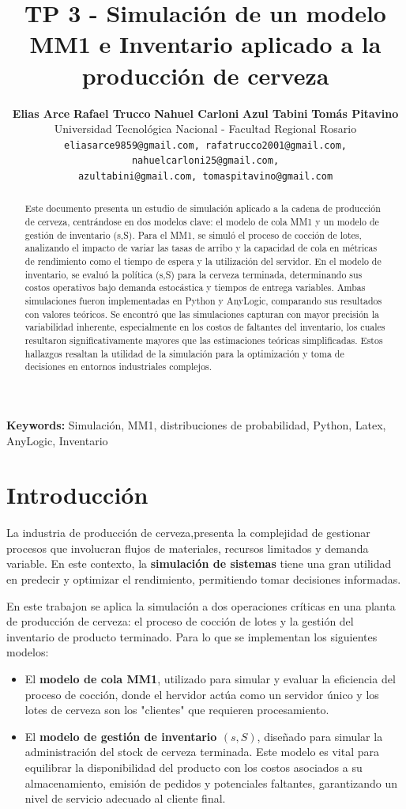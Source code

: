 \documentclass{article}
\title{TP 3 - Simulación de un modelo MM1 e Inventario aplicado a la producción de cerveza}
\author{
  \textbf{Elias Arce} \quad \textbf{Rafael Trucco} \quad \textbf{Nahuel Carloni} \quad \textbf{Azul Tabini} \quad \textbf{Tomás Pitavino} \\
  \small Universidad Tecnológica Nacional - Facultad Regional Rosario \\
  \small \texttt{eliasarce9859@gmail.com, rafatrucco2001@gmail.com, nahuelcarloni25@gmail.com,} \\
  \small \texttt{azultabini@gmail.com, tomaspitavino@gmail.com}
}
\begin{document}
\maketitle


\begin{abstract}
Este documento presenta un estudio de simulación aplicado a la cadena de producción de cerveza, centrándose en dos modelos clave: el modelo de cola MM1 y un modelo de gestión de inventario (s,S). Para el MM1, se simuló el proceso de cocción de lotes, analizando el impacto de variar las tasas de arribo y la capacidad de cola en métricas de rendimiento como el tiempo de espera y la utilización del servidor. En el modelo de inventario, se evaluó la política (s,S) para la cerveza terminada, determinando sus costos operativos bajo demanda estocástica y tiempos de entrega variables. Ambas simulaciones fueron implementadas en Python y AnyLogic, comparando sus resultados con valores teóricos. Se encontró que las simulaciones capturan con mayor precisión la variabilidad inherente, especialmente en los costos de faltantes del inventario, los cuales resultaron significativamente mayores que las estimaciones teóricas simplificadas. Estos hallazgos resaltan la utilidad de la simulación para la optimización y toma de decisiones en entornos industriales complejos.
\end{abstract}
\textbf{Keywords:} Simulación, MM1, distribuciones de probabilidad, Python, Latex, AnyLogic, Inventario


\section{Introducción}
La industria de producción de cerveza,presenta la complejidad de gestionar procesos que involucran flujos de materiales, recursos limitados y demanda variable. En este contexto, la \textbf{simulación de sistemas} tiene una gran utilidad en predecir y optimizar el rendimiento, permitiendo tomar decisiones informadas.


En este trabajon se aplica la simulación a dos operaciones críticas en una planta de producción de cerveza: el proceso de cocción de lotes y la gestión del inventario de producto terminado. Para lo que se implementan los siguientes modelos:
\begin{itemize}
    \item El \textbf{modelo de cola MM1}, utilizado para simular y evaluar la eficiencia del proceso de cocción, donde el hervidor actúa como un servidor único y los lotes de cerveza son los "clientes" que requieren procesamiento.
    \item El \textbf{modelo de gestión de inventario $(s,S)$}, diseñado para simular la administración del stock de cerveza terminada. Este modelo es vital para equilibrar la disponibilidad del producto con los costos asociados a su almacenamiento, emisión de pedidos y potenciales faltantes, garantizando un nivel de servicio adecuado al cliente final.
\end{itemize}
\end{document}
